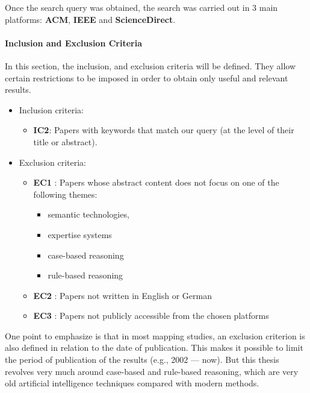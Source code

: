             Once the search query was obtained, the search was carried out in 3 main platforms: \textbf{ACM}, \textbf{IEEE} and \textbf{ScienceDirect}. 


            \paragraph{Inclusion and Exclusion Criteria}
            In this section, the inclusion, and exclusion criteria will be defined. They allow certain restrictions to be imposed in order to obtain only useful and relevant results.

            \begin{itemize}
                \item Inclusion criteria:
                    \begin{itemize}
                        \item \textbf{IC2}: Papers with keywords that match our query (at the level of their title or abstract).
                    \end{itemize}

                \item Exclusion criteria:
                    \begin{itemize}
                        \item \textbf{EC1} : Papers whose abstract content does not focus on one of the following themes:
                            \begin{itemize}
                                \item semantic technologies,
                                \item expertise systems
                                \item case-based reasoning
                                \item rule-based reasoning
                            \end{itemize}

                        \item \textbf{EC2} : Papers not written in English or German

                        \item \textbf{EC3} : Papers not publicly accessible from the chosen platforms
                    \end{itemize}
            \end{itemize}

            One point to emphasize is that in most mapping studies, an exclusion criterion is also defined in relation to the date of publication. This makes it possible to limit the period of publication of the results (e.g., 2002 — now). But this thesis revolves very much around case-based and rule-based reasoning, which are very old artificial intelligence techniques compared with modern methods.

